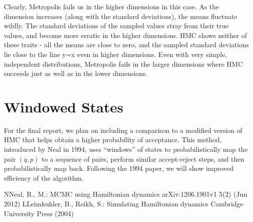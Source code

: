 \documentclass{article}
\numberwithin{equation}{section}
\begin{document}
Clearly, Metropolis fails us in the higher dimensions in this case. As the dimension increases (along with the standard deviations), the means fluctuate wildly. The standard deviations of the sampled values stray from their true values, and become more erratic in the higher dimensions. HMC shows neither of these traits - all the means are close to zero, and the sampled standard deviations lie close to the line y=x even in higher dimensions. Even with very simple, independent distributions, Metropolis fails in the larger dimensions where HMC succeeds  just as well as in the lower dimensions. 

\section{Windowed States}
For the final report, we plan on including a comparison to a modified version of HMC that helps obtain a higher probability of acceptance. This method, introduced by Neal in 1994, uses ``windows'' of states to probabilistically map the pair $(q,p)$ to a sequence of pairs, perform similar accept-reject steps, and then probabilistically map back. Following the 1994 paper, we will show improved efficiency of the algorithm.


\begin{thebibliography}{99} %

\bibitem[1]NNeal, R., M.: MCMC using Hamiltonian dynamics 
\newblock arXiv:1206.1901v1 5(2)
(Jun 2012)
\bibitem[2]LLeimkuhler, B., Reikh, S.: Simulating Hamiltonian dynamics 
\newblock Cambridge University Press
(2004)
\end{thebibliography}
\end{document}
